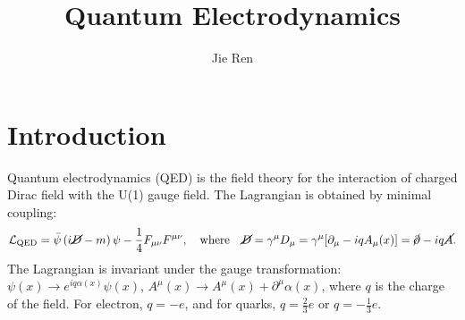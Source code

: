 \documentclass[aps,prb,superscriptaddress,nofootinbib]{revtex4}
\begin{document}
\title{Quantum Electrodynamics}
\author{Jie Ren}


\maketitle


\tableofcontents

\section{Introduction}

Quantum electrodynamics (QED) is the field theory for the interaction of charged Dirac field with the U(1) gauge field. 
The Lagrangian is obtained by minimal coupling:
\begin{equation}
	\mathcal{L}_{\mathrm{QED}}
	= \bar\psi \left(i\cancel{D} - m\right)\psi - \frac{1}{4}F_{\mu\nu}F^{\mu\nu}, 
	\quad\text{where}\quad
	\cancel{D} = \gamma^\mu D_\mu 
	= \gamma^\mu [\partial_\mu - i q A_\mu(x)]
	= \cancel{\partial} - iq \cancel{A}.
\end{equation}
The Lagrangian is invariant under the gauge transformation: $\psi(x) \rightarrow e^{iq\alpha(x)}\psi(x)$, $A^\mu(x) \rightarrow A^\mu(x) + \partial^\mu \alpha(x)$, where $q$ is the charge of the field.
For electron, $q=-e$, and for quarks, $q=\frac{2}{3}e$ or $q=-\frac{1}{3}e$.
\end{document}
